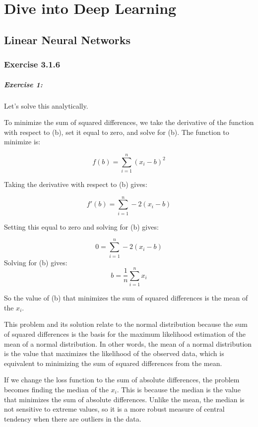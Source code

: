 \chapter{Dive into Deep Learning}\label{chp:dive-into-deep-learning}

\section{Linear Neural Networks}\label{sec:Linear Neural Networks}

\subsection{Exercise 3.1.6}

\paragraph{Exercise 1:}

Let’s solve this analytically.

To minimize the sum of squared differences, we take the derivative of the function with respect to (b), set it equal to zero, and solve for (b).
The function to minimize is:

\[
	f(b) = \sum_{i=1}^{n} \left(x_i - b\right)^2
\]

Taking the derivative with respect to (b) gives:

\[
	f'(b) = \sum_{i=1}^{n} -2\left(x_i - b\right)
\]

Setting this equal to zero and solving for (b) gives:

\[
	0 = \sum_{i=1}^{n} -2(x_i - b)
\]
Solving for (b) gives:
\[
	b = \frac{1}{n} \sum_{i=1}^{n} x_i
\]

So the value of (b) that minimizes the sum of squared differences is the mean of the \(x_i\).

This problem and its solution relate to the normal distribution because the sum of squared differences is the basis for the maximum likelihood estimation of the mean of a normal distribution.
In other words, the mean of a normal distribution is the value that maximizes the likelihood of the observed data, which is equivalent to minimizing the sum of squared differences from the mean.


If we change the loss function to the sum of absolute differences, the problem becomes finding the median of the \(x_i\).
This is because the median is the value that minimizes the sum of absolute differences.
Unlike the mean, the median is not sensitive to extreme values, so it is a more robust measure of central tendency when there are outliers in the data.

